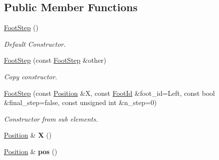 \subsection*{Public Member Functions}
\begin{DoxyCompactItemize}
\item 
\hyperlink{classow__core_1_1FootStep_a6bcbfb052b7e3cac983e15c7a9214d43}{Foot\+Step} ()\hypertarget{classow__core_1_1FootStep_a6bcbfb052b7e3cac983e15c7a9214d43}{}\label{classow__core_1_1FootStep_a6bcbfb052b7e3cac983e15c7a9214d43}

\begin{DoxyCompactList}\small\item\em Default Constructor. \end{DoxyCompactList}\item 
\hyperlink{classow__core_1_1FootStep_ac8cd61ca950cb3269005406a0dcb9f1e}{Foot\+Step} (const \hyperlink{classow__core_1_1FootStep}{Foot\+Step} \&other)\hypertarget{classow__core_1_1FootStep_ac8cd61ca950cb3269005406a0dcb9f1e}{}\label{classow__core_1_1FootStep_ac8cd61ca950cb3269005406a0dcb9f1e}

\begin{DoxyCompactList}\small\item\em Copy constructor. \end{DoxyCompactList}\item 
\hyperlink{classow__core_1_1FootStep_aa997761aa6d128a210b3a67ac16214a8}{Foot\+Step} (const \hyperlink{classow__core_1_1CartesianPosition}{Position} \&X, const \hyperlink{foot__id_8h_a57e66d30579b22cfe2c17c739278e5a6}{Foot\+Id} \&foot\+\_\+id=Left, const bool \&final\+\_\+step=false, const unsigned int \&n\+\_\+step=0)\hypertarget{classow__core_1_1FootStep_aa997761aa6d128a210b3a67ac16214a8}{}\label{classow__core_1_1FootStep_aa997761aa6d128a210b3a67ac16214a8}

\begin{DoxyCompactList}\small\item\em Constructor from sub elements. \end{DoxyCompactList}\item 
\hyperlink{classow__core_1_1CartesianPosition}{Position} \& {\bfseries X} ()\hypertarget{classow__core_1_1FootStep_a6137257a444cbad92dd6dfb82124681d}{}\label{classow__core_1_1FootStep_a6137257a444cbad92dd6dfb82124681d}

\item 
\hyperlink{classow__core_1_1CartesianPosition}{Position} \& {\bfseries pos} ()\hypertarget{classow__core_1_1FootStep_a506a237314d4079235477f4aff58d3a4}{}\label{classow__core_1_1FootStep_a506a237314d4079235477f4aff58d3a4}


\end{DoxyCompactItemize}
